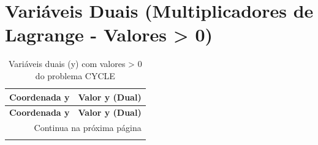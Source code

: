 \documentclass[12pt]{article}
\begin{document}
\section{Variáveis Duais (Multiplicadores de Lagrange - Valores > 0)}

\begin{longtable}{@{}cc@{}}
\caption{Variáveis duais (y) com valores > 0 do problema CYCLE} \\
\toprule
\textbf{Coordenada y} & \textbf{Valor y (Dual)} \\
\midrule
\endfirsthead

\toprule
\textbf{Coordenada y} & \textbf{Valor y (Dual)} \\
\midrule
\endhead

\midrule \multicolumn{2}{r}{{Continua na próxima página}} \\ \midrule
\endfoot


\end{longtable}
\end{document}
